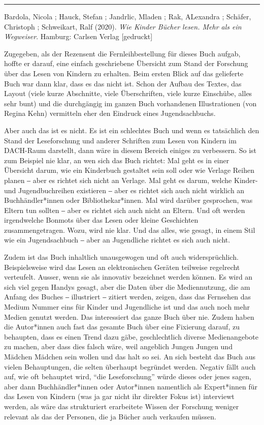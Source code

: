 \documentclass[a4paper,
fontsize=11pt,
oneside,
numbers=noperiodatend,
parskip=half-,
bibliography=totoc,
final
]{scrartcl}
\begin{document}
\begin{center}\rule{0.5\linewidth}{0.5pt}\end{center}

Bardola, Nicola ; Hauck, Stefan ; Jandrlic, Mladen ; Rak, ALexandra ;
Schäfer, Christoph ; Schweikart, Ralf (2020). \emph{Wie Kinder Bücher
lesen. Mehr als ein Wegweiser}. Hamburg: Carlsen Verlag {[}gedruckt{]}

Zugegeben, als der Rezensent die Fernleihbestellung für dieses Buch
aufgab, hoffte er darauf, eine einfach geschriebene Übersicht zum Stand
der Forschung über das Lesen von Kindern zu erhalten. Beim ersten Blick
auf das gelieferte Buch war dann klar, dass es das nicht ist. Schon der
Aufbau des Textes, das Layout (viele kurze Abschnitte, viele
Überschriften, viele kurze Einschübe, alles sehr bunt) und die
durchgängig im ganzen Buch vorhandenen Illustrationen (von Regina Kehn)
vermitteln eher den Eindruck eines Jugendsachbuchs.

Aber auch das ist es nicht. Es ist ein schlechtes Buch und wenn es
tatsächlich den Stand der Leseforschung und anderer Schriften zum Lesen
von Kindern im DACH-Raum darstellt, dann wäre in diesem Bereich einiges
zu verbessern. So ist zum Beispiel nie klar, an wen sich das Buch
richtet: Mal geht es in einer Übersicht darum, wie ein Kinderbuch
gestaltet sein soll oder wie Verlage Reihen planen ‒ aber es richtet
sich nicht an Verlage. Mal geht es darum, welche Kinder- und
Jugendbuchreihen existieren ‒ aber es richtet sich auch nicht wirklich
an Buchhändler*innen oder Bibliothekar*innen. Mal wird darüber
gesprochen, was Eltern tun sollten ‒ aber es richtet sich auch nicht an
Eltern. Und oft werden irgendwelche Bonmots über das Lesen oder kleine
Geschichten zusammengetragen. Wozu, wird nie klar. Und das alles, wie
gesagt, in einem Stil wie ein Jugendsachbuch ‒ aber an Jugendliche
richtet es sich auch nicht.

Zudem ist das Buch inhaltlich unausgewogen und oft auch widersprüchlich.
Beispielsweise wird das Lesen an elektronischen Geräten teilweise
regelrecht verteufelt. Ausser, wenn sie als innovativ bezeichnet werden
können. Es wird an sich viel gegen Handys gesagt, aber die Daten über
die Mediennutzung, die am Anfang des Buches ‒ illustriert ‒ zitiert
werden, zeigen, dass das Fernsehen das Medium Nummer eins für Kinder und
Jugendliche ist und das auch noch mehr Medien genutzt werden. Das
interessiert das ganze Buch über nie. Zudem haben die Autor*innen auch
fast das gesamte Buch über eine Fixierung darauf, zu behaupten, dass es
einen Trend dazu gäbe, geschlechtlich diverse Medienangebote zu machen,
aber dass dies falsch wäre, weil angeblich Jungen Jungen und Mädchen
Mädchen sein wollen und das halt so sei. An sich besteht das Buch aus
vielen Behauptungen, die selten überhaupt begründet werden. Negativ
fällt auch auf, wie oft behauptet wird, \enquote{die Leseforschung}
würde dieses oder jenes sagen, aber dann Buchhändler*innen oder
Autor*innen namentlich als Expert*innen für das Lesen von Kindern (was
ja gar nicht ihr direkter Fokus ist) interviewt werden, als wäre das
strukturiert erarbeitete Wissen der Forschung weniger relevant als das
der Personen, die ja Bücher auch verkaufen müssen.
\end{document}
